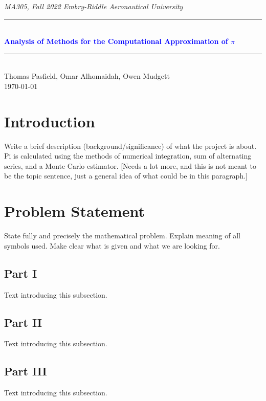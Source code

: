 \documentclass[11pt]{article}
\newcommand{\horrule}[1]{\rule{\linewidth}{#1}} 	%
\begin{document}
\begin{center}
{\it MA305, Fall 2022  \hfill Embry-Riddle Aeronautical University
 }\\
		\horrule{0.5pt} \\[0.4cm]
		\textcolor{blue}{\bf \Large  %
			Analysis of Methods for the Computational Approximation of $\pi$
			}\\
		\horrule{2pt} \\[5cm]
		Thomas Pasfield, Omar Alhomaidah, Owen Mudgett  %
\\[0.4cm]
\today %
\end{center}
\thispagestyle{empty}
\newpage
\begin{abstract}
\end{abstract}
\tableofcontents 
\newpage

\section{Introduction}\label{S:1}
Write a brief description (background/significance) of what the project is about. \\

Pi is calculated using the methods of numerical integration, sum of alternating series, and a Monte Carlo estimator. [Needs a lot more, and this is not meant to be the topic sentence, just a general idea of what could be in this paragraph.]


\section{Problem Statement}\label{S:2}
State fully and precisely the mathematical problem.  
Explain meaning of all symbols used. Make clear what is given and what we are looking for. 

\subsection{Part I}\label{S:2.1}
%
Text introducing this subsection. 

\subsection{Part II}\label{S:2.2}
%
Text introducing this subsection. 
\subsection{Part III}\label{S:2.3}
%
Text introducing this subsection.
\end{document}
